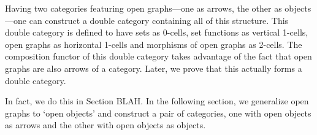 \documentclass[master_reopn]{subfiles}
\begin{document}
Having two categories featuring open graphs---one as arrows, the other as objects---one can construct a double category containing all of this structure.  This double category is defined to have sets as 0-cells, set functions as vertical 1-cells, open graphs as horizontal 1-cells and morphisms of open graphs as 2-cells.  The composition functor of this double category takes advantage of the fact that open graphs are also arrows of a category.  
Later, we prove that this actually forms a double category. 




In fact, we do this in Section BLAH. 
In the following section, we generalize open graphs to `open objects' and construct a pair of categories, one with open objects as arrows and the other with open objects as objects.  
\end{document}
